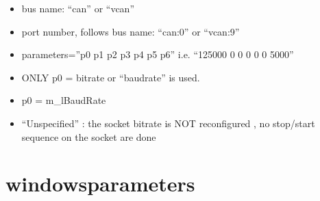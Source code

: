\documentclass[a4paper,10pt,english]{sphinxmanual}
\begin{document}
\begin{itemize}
\item {} 
\sphinxAtStartPar
bus name: “can” or “vcan”

\item {} 
\sphinxAtStartPar
port number, follows bus name: “can:0” or “vcan:9”

\item {} 
\sphinxAtStartPar
parameters=”p0 p1 p2 p3 p4 p5 p6” i.e. “125000 0 0 0 0 0 5000”

\item {} 
\sphinxAtStartPar
ONLY p0 = bitrate or “baudrate” is used.

\item {} 
\sphinxAtStartPar
p0 = m\_lBaudRate

\item {} 
\sphinxAtStartPar
“Unspecified” : the socket bitrate is NOT reconfigured , no stop/start sequence on the socket are done

\end{itemize}


\section{windows\sphinxhyphen{}parameters}
\label{\detokenize{vendors/systec:windows-parameters}}
\end{document}
